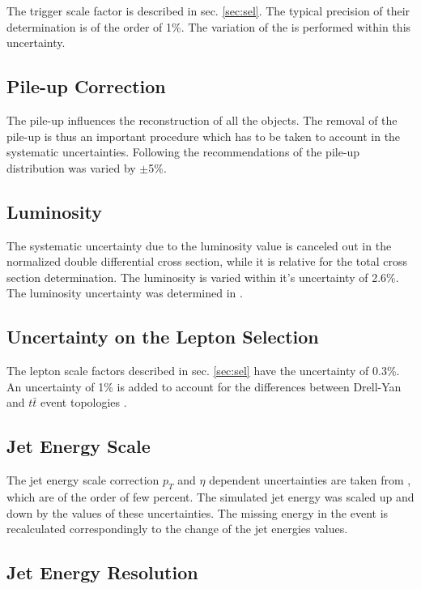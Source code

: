 The trigger scale factor is described in sec. \ref{sec:sel}. The typical precision of their determination is of the order
of 1\%. The variation of the  is performed within this uncertainty.

\subsection{Pile-up Correction}

The pile-up influences the reconstruction of all the objects. The removal of the pile-up is thus an important procedure
which has to be taken to account in the systematic uncertainties. Following the recommendations of \cite{TWikiSystPU} the
pile-up distribution was varied by $\pm$5\%.

\subsection{Luminosity}

The systematic uncertainty due to the luminosity value is canceled out in the normalized double differential cross section,
while it is relative for the total cross section determination. The luminosity is varied within it's uncertainty of 2.6\%. 
The luminosity uncertainty was determined in \cite{CMS-PAS-LUM-13-001}.

\subsection{Uncertainty on the Lepton Selection}

The lepton scale factors described in sec. \ref{sec:sel} have the uncertainty of 0.3\%. An uncertainty of 1\% is added to account for
the differences between Drell-Yan and $t\bar{t}$ event topologies \cite{AN-2012-389}.

\subsection{Jet Energy Scale}

The jet energy scale correction $p_{T}$ and $\eta$ dependent uncertainties are taken from \cite{CMS-PAS-JME-10-010}, which are of the
order of few percent. The simulated jet energy was scaled up and down by the values of these uncertainties. The missing energy in the 
event is recalculated correspondingly to the change of the jet energies values.

\subsection{Jet Energy Resolution}

